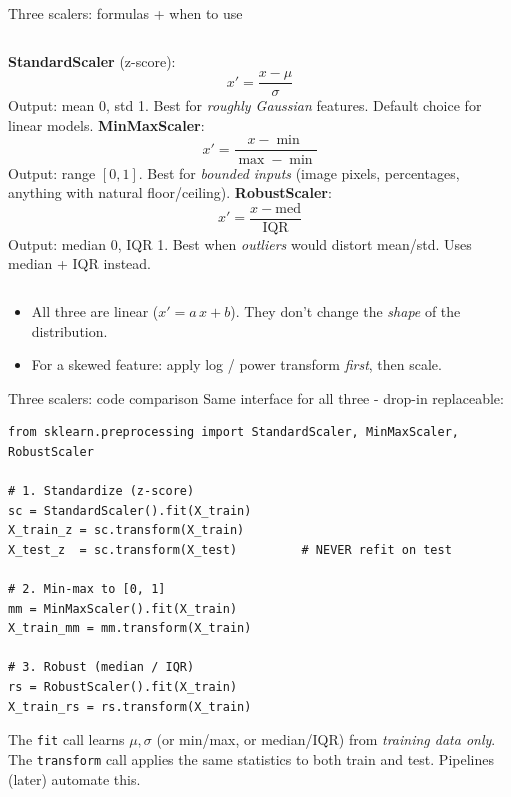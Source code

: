 \documentclass[aspectratio=169]{beamer}
\begin{document}
\begin{frame}{Three scalers: formulas + when to use}
  \begin{columns}[T]
    \textbf{StandardScaler} (z-score):
    \[
      x' = \frac{x - \mu}{\sigma}
    \]
    Output: mean 0, std 1.
    \vskip 4pt
    \footnotesize Best for \emph{roughly Gaussian} features. Default choice for linear models.
    \textbf{MinMaxScaler}:
    \[
      x' = \frac{x - \min}{\max - \min}
    \]
    Output: range $[0, 1]$.
    \vskip 4pt
    \footnotesize Best for \emph{bounded inputs} (image pixels, percentages, anything with natural floor/ceiling).
    \textbf{RobustScaler}:
    \[
      x' = \frac{x - \text{med}}{\text{IQR}}
    \]
    Output: median 0, IQR 1.
    \vskip 4pt
    \footnotesize Best when \emph{outliers} would distort mean/std. Uses median + IQR instead.
  \end{columns}
  \vfill
  \begin{itemize}\small
    \item All three are linear ($x' = a\,x + b$). They don't change the \emph{shape} of the distribution.
    \item For a skewed feature: apply log / power transform \emph{first}, then scale.
  \end{itemize}
\end{frame}

\begin{frame}[fragile]{Three scalers: code comparison}
  Same interface for all three - drop-in replaceable:
\begin{lstlisting}
from sklearn.preprocessing import StandardScaler, MinMaxScaler, RobustScaler

# 1. Standardize (z-score)
sc = StandardScaler().fit(X_train)
X_train_z = sc.transform(X_train)
X_test_z  = sc.transform(X_test)         # NEVER refit on test

# 2. Min-max to [0, 1]
mm = MinMaxScaler().fit(X_train)
X_train_mm = mm.transform(X_train)

# 3. Robust (median / IQR)
rs = RobustScaler().fit(X_train)
X_train_rs = rs.transform(X_train)
\end{lstlisting}
  \vfill
  \footnotesize The \texttt{fit} call learns $\mu, \sigma$ (or min/max, or median/IQR) from \emph{training data only}. The \texttt{transform} call applies the same statistics to both train and test. Pipelines (later) automate this.
\end{frame}
\end{document}
